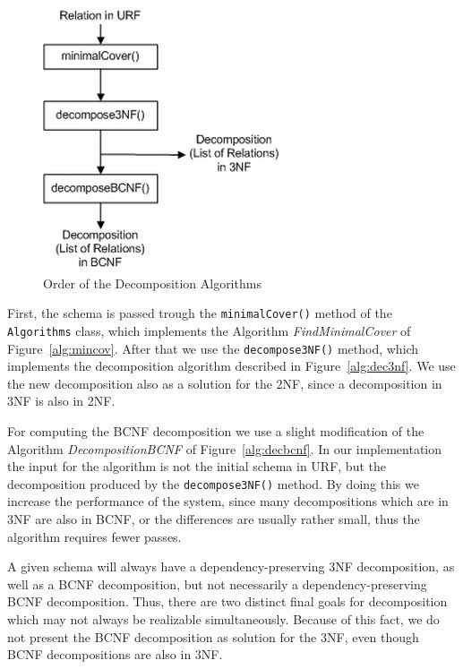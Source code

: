 \begin{figure}[h]
	\begin{center}
		\includegraphics[scale=0.6]{./img/decomposition1a.png}
		\caption{Order of the Decomposition Algorithms}
		\label{fig:orderdecomposition}
	\end{center}
\end{figure}

First, the schema is passed trough the
\verb=minimalCover()= method of the \verb=Algorithms= class, which
implements the Algorithm \textit{FindMinimalCover} of Figure~\ref{alg:mincov}. 
After that we use the \verb=decompose3NF()= method, which implements the 
decomposition algorithm described in Figure~\ref{alg:dec3nf}. 
We use the new decomposition also as a solution for the 2NF, since
a decomposition in 3NF is also in 2NF. 

For computing the BCNF decomposition we use 
a slight modification of the Algorithm \textit{DecompositionBCNF} of Figure~\ref{alg:decbcnf}.
In our implementation
the input for the algorithm is not the initial schema in URF, but the decomposition
produced by the \verb=decompose3NF()= method. By doing this we 
increase the performance of the system, since many decompositions which 
are in 3NF are also in BCNF, or the differences are usually rather small, thus the algorithm
requires fewer passes.   
  
A given schema will always have a dependency-preserving 3NF
decomposition, as well as a BCNF decomposition, but not necessarily a
dependency-preserving BCNF decomposition. Thus, there are two
distinct final goals for decomposition which may not always be
realizable simultaneously. Because of this fact, we do not present the BCNF decomposition as solution
for the 3NF, even though BCNF decompositions are also in 3NF.

